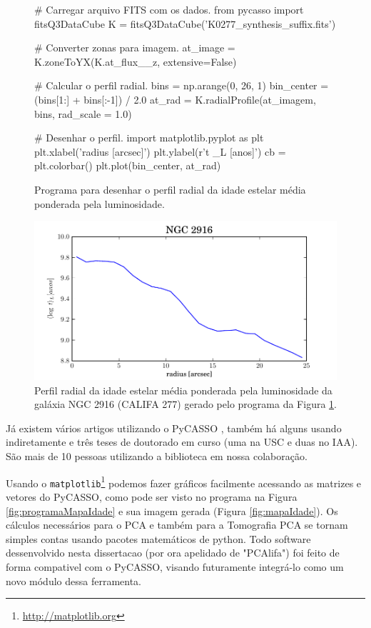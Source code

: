 \begin{figure}
\begin{python}
# Carregar arquivo FITS com os dados.
from pycasso import fitsQ3DataCube
K = fitsQ3DataCube('K0277_synthesis_suffix.fits')

# Converter zonas para imagem.
at_image = K.zoneToYX(K.at_flux__z, extensive=False)

# Calcular o perfil radial.
bins = np.arange(0, 26, 1)
bin_center = (bins[1:] + bins[:-1]) / 2.0
at_rad = K.radialProfile(at_imagem, bins, rad_scale = 1.0)

# Desenhar o perfil.
import matplotlib.pyplot as plt
plt.xlabel('radius [arcsec]')
plt.ylabel(r'\langle \log t \langle_L [anos]')
cb = plt.colorbar()
plt.plot(bin_center, at_rad)

\end{python}
	\caption[Exemplo de programa para perfil radial]
	{Programa para desenhar o perfil radial da idade estelar média ponderada pela
	luminosidade.}
	\label{fig:programaPerfRad}
\end{figure}

\begin{figure}
	\includegraphics{figuras/at_flux_radprof.pdf}
	\caption[Perfil radial da idade estelar média da galáxia NGC 2916]
	{Perfil radial da idade estelar média ponderada pela luminosidade da galáxia
	NGC 2916 (CALIFA 277) gerado pelo programa da Figura \ref{fig:programaPerfRad}.}
	\label{fig:perfRad}
\end{figure}

Já existem vários artigos utilizando o PyCASSO \citep{CidFernandes2013, CidFernandes2014, Perez2013,
GonzalezDelgado2013}, também há alguns usando indiretamente \citep{Husemann2013, IglesiasParamo2013} e três teses de
doutorado em curso (uma na USC e duas no IAA). São mais de 10 pessoas utilizando a biblioteca em nossa colaboração.

Usando o \texttt{matplotlib}\footnote{\url{http://matplotlib.org}} podemos fazer gráficos facilmente acessando as
matrizes e vetores do PyCASSO, como pode ser visto no programa na Figura \ref{fig:programaMapaIdade} e sua imagem gerada
(Figura \ref{fig:mapaIdade}). Os cálculos necessários para o PCA e também para a Tomografia PCA se tornam simples contas
usando pacotes matemáticos de python. Todo software dessenvolvido nesta dissertacao (por ora apelidado de "PCAlifa") foi
feito de forma compativel com o PyCASSO, visando futuramente integrá-lo como um novo módulo dessa ferramenta.

